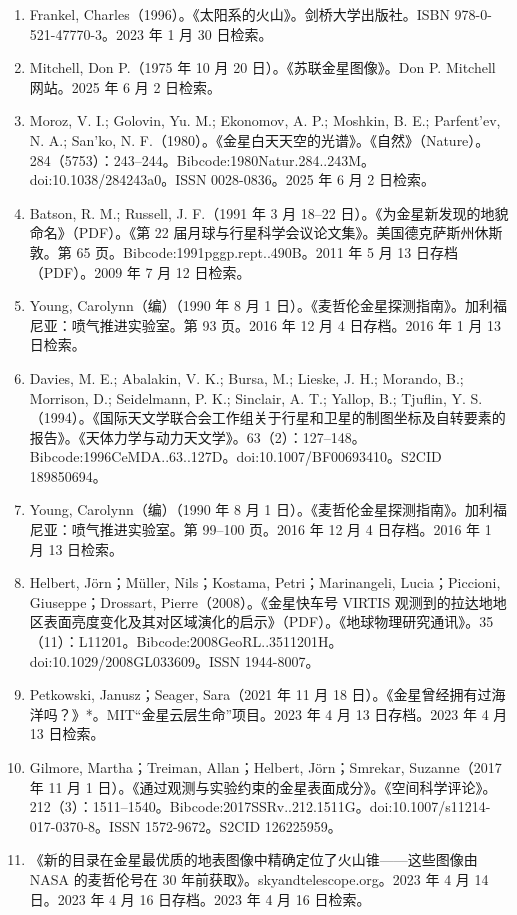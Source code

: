 \begin{enumerate}
\item Frankel, Charles（1996）。《太阳系的火山》。剑桥大学出版社。ISBN 978-0-521-47770-3。2023 年 1 月 30 日检索。
\item Mitchell, Don P.（1975 年 10 月 20 日）。《苏联金星图像》。Don P. Mitchell 网站。2025 年 6 月 2 日检索。
\item Moroz, V. I.; Golovin, Yu. M.; Ekonomov, A. P.; Moshkin, B. E.; Parfent'ev, N. A.; San'ko, N. F.（1980）。《金星白天天空的光谱》。《自然》（Nature）。284（5753）：243–244。Bibcode:1980Natur.284..243M。doi:10.1038/284243a0。ISSN 0028-0836。2025 年 6 月 2 日检索。
\item Batson, R. M.; Russell, J. F.（1991 年 3 月 18–22 日）。《为金星新发现的地貌命名》（PDF）。《第 22 届月球与行星科学会议论文集》。美国德克萨斯州休斯敦。第 65 页。Bibcode:1991pggp.rept..490B。2011 年 5 月 13 日存档（PDF）。2009 年 7 月 12 日检索。
\item Young, Carolynn（编）（1990 年 8 月 1 日）。《麦哲伦金星探测指南》。加利福尼亚：喷气推进实验室。第 93 页。2016 年 12 月 4 日存档。2016 年 1 月 13 日检索。
\item Davies, M. E.; Abalakin, V. K.; Bursa, M.; Lieske, J. H.; Morando, B.; Morrison, D.; Seidelmann, P. K.; Sinclair, A. T.; Yallop, B.; Tjuflin, Y. S.（1994）。《国际天文学联合会工作组关于行星和卫星的制图坐标及自转要素的报告》。《天体力学与动力天文学》。63（2）：127–148。Bibcode:1996CeMDA..63..127D。doi:10.1007/BF00693410。S2CID 189850694。
\item Young, Carolynn（编）（1990 年 8 月 1 日）。《麦哲伦金星探测指南》。加利福尼亚：喷气推进实验室。第 99–100 页。2016 年 12 月 4 日存档。2016 年 1 月 13 日检索。
\item Helbert, Jörn；Müller, Nils；Kostama, Petri；Marinangeli, Lucia；Piccioni, Giuseppe；Drossart, Pierre（2008）。《金星快车号 VIRTIS 观测到的拉达地地区表面亮度变化及其对区域演化的启示》（PDF）。《地球物理研究通讯》。35（11）：L11201。Bibcode:2008GeoRL..3511201H。doi:10.1029/2008GL033609。ISSN 1944-8007。
\item Petkowski, Janusz；Seager, Sara（2021 年 11 月 18 日）。《金星曾经拥有过海洋吗？》*。MIT“金星云层生命”项目。2023 年 4 月 13 日存档。2023 年 4 月 13 日检索。
\item Gilmore, Martha；Treiman, Allan；Helbert, Jörn；Smrekar, Suzanne（2017 年 11 月 1 日）。《通过观测与实验约束的金星表面成分》。《空间科学评论》。212（3）：1511–1540。Bibcode:2017SSRv..212.1511G。doi:10.1007/s11214-017-0370-8。ISSN 1572-9672。S2CID 126225959。
\item 《新的目录在金星最优质的地表图像中精确定位了火山锥——这些图像由 NASA 的麦哲伦号在 30 年前获取》。skyandtelescope.org。2023 年 4 月 14 日。2023 年 4 月 16 日存档。2023 年 4 月 16 日检索。

\end{enumerate}
